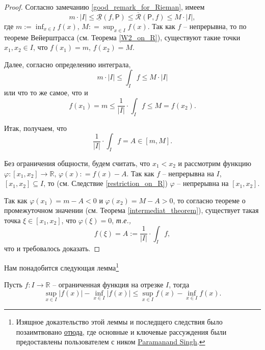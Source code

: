 \begin{proof}
Согласно замечанию \ref{good_remark_for_Rieman}, имеем
\[
 m \cdot |I| \le \underline{\mathcal{R}}(f,\mathsf{P}) \le \overline{\mathcal{R}}(\mathsf{P},f) \le M \cdot |I|,
 \]
где $m:= \inf_{x\in I}f(x)$, $M: = \sup_{x\in I}f(x)$. Так как $f$ -- непрерывна, то по теореме Вейерштрасса (см. Теорема \ref{W2_on_R}), существуют такие точки $x_1, x_2 \in I$, что $f(x_1) = m$, $f(x_2) = M$. 

Далее, согласно определению интеграла, 
\[
 m \cdot |I| \le \int_I f \le M \cdot |I|
\]
или что то же самое, что и
\[
 f(x_1) =m \le \frac{1}{|I|}\cdot \int_I f \le M = f(x_2).
\]

Итак, получаем, что 
\[
 \frac{1}{|I|}\cdot \int_I f = A \in [m,M].
\]

Без ограничения общности, будем считать, что $x_1<x_2$ и рассмотрим функцию $\varphi:[x_1,x_2] \to \mathbb{R}$, $\varphi(x): = f(x) - A$. Так как $f$ -- непрерывна на $I$, $[x_1,x_2] \subseteq I$, то (см. Следствие \ref{restriction_on_R}) $\varphi$ -- непрерывна на $[x_1,x_2]$.

Так как $\varphi(x_1) = m-A <0$ и $\varphi(x_2) = M-A>0$, то согласно теореме о промежуточном значении (см. Теорема \ref{intermediat_theorem}), существует такая точка $\xi\in [x_1,x_2]$, что $\varphi(\xi)=0$, \textit{т.е.,} 
\[
 f(\xi) = A :=  \frac{1}{|I|}\cdot \int_I f,
\]
что и требовалось доказать.
\end{proof}



Нам понадобится следующая лемма\footnote{Изящное доказтельство этой леммы и последщего следствия было позаимтвовано \href{https://math.stackexchange.com/questions/451146/if-f-is-integrable-then-f-is-also-integrable?noredirect=1&lq=1}{отюда}, где основные и ключевые рассуждения были предоставлены пользователем с ником \href{https://math.stackexchange.com/users/72031/paramanand-singh}{Paramanand Singh}.}

\begin{lemma}
    Пусть $f:I \to \mathbb{R}$ -- ограниченная функция на отрезке $I$, тогда 
    \[
     \sup_{x\in I} |f(x)| - \inf_{x \in I} |f(x)| \le \sup_{x \in I} f(x) - \inf_{x \in I} f(x).
    \]
\end{lemma}

